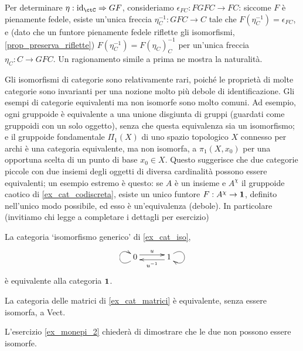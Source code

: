 \begin{remark}
\begin{itemize}
		      Per determinare \(\eta : \Id[\ctC] \nat GF\), consideriamo \(\epsilon_{FC} : FGFC \to FC\): siccome \(F\) è pienamente fedele, esiste un'unica freccia \(\eta^{-1}_C : GFC\to C\) tale che \(F(\eta^{-1}_C) = \epsilon_{FC}\), e (dato che un funtore pienamente fedele riflette gli isomorfismi, \ref{prop_preserva_riflette}) \(F(\eta^{-1}_C)=F(\eta_C)^{-1}_C\) per un'unica freccia \(\eta_C : C\to GFC\). Un ragionamento simile a prima ne mostra la naturalità.
	\end{itemize}
\end{remark}
Gli isomorfismi di categorie sono relativamente rari, poiché le proprietà di molte categorie sono invarianti per una nozione molto più debole di identificazione.
Gli esempi di categorie equivalenti ma non isomorfe sono molto comuni. Ad esempio, ogni gruppoide è equivalente a una unione disgiunta di gruppi (guardati come gruppoidi con un solo oggetto), senza che questa equivalenza sia un isomorfismo; e il gruppoide fondamentale \(\Pi_1(X)\) di uno spazio topologico \(X\) connesso per archi è una categoria equivalente, ma non isomorfa, a \(\pi_1(X,x_0)\) per una opportuna scelta di un punto di base \(x_0\in X\). Questo suggerisce che due categorie piccole con due insiemi degli oggetti di diversa cardinalità possono essere equivalenti; un esempio estremo è questo: se \(A\) è un insieme e \(A^\chi\) il gruppoide caotico di \ref{ex_cat_codiscreta}, esiste un unico funtore \(F : A^\chi \to \mathbf{1}\), definito nell'unico modo possibile, ed esso è un'equivalenza (debole). In particolare (invitiamo chi legge a completare i dettagli per esercizio)
\begin{remark}
	La categoria `isomorfismo generico' di \ref{ex_cat_iso},
	\[\xymatrix@C=7ex{0 \ar@<.7ex>[r]^u \ar@(dl,ul)[] & 1 \ar@<.7ex>[l]^{u^{-1}} \ar@(ur,dr)[]}\]
	è equivalente alla categoria \(\mathbf{1}\).
\end{remark}
\begin{example}
	La categoria delle matrici di \ref{ex_cat_matrici} è equivalente, senza essere isomorfa, a Vect.
\end{example}
L'esercizio \ref{ex_monepi_2} chiederà di dimostrare che le due non possono essere isomorfe.

